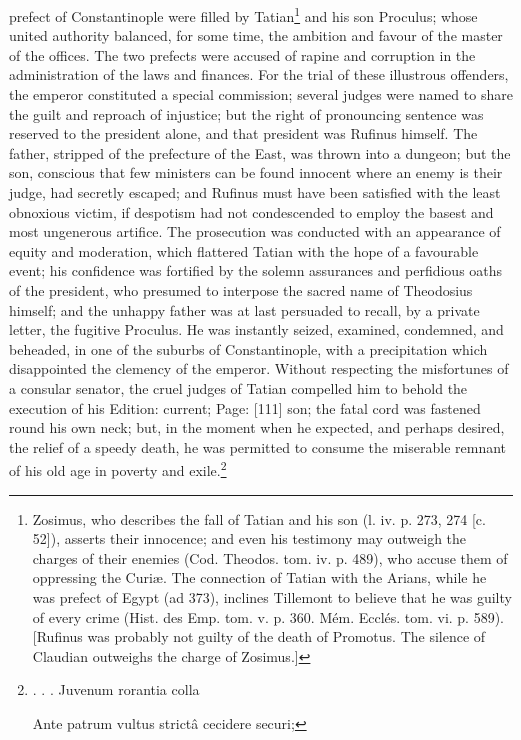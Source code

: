 prefect of Constantinople were filled by Tatian\footnote{Zosimus, who describes the fall of Tatian and his son (l. iv. p. 273, 274 [c. 52]), asserts their innocence; and even his testimony may outweigh the charges of their enemies (Cod. Theodos. tom. iv. p. 489), who accuse them of oppressing the Curiæ. The connection of Tatian with the Arians, while he was prefect of Egypt (ad 373), inclines Tillemont to believe that he was guilty of every crime (Hist. des Emp. tom. v. p. 360. Mém. Ecclés. tom. vi. p. 589). [Rufinus was probably not guilty of the death of Promotus. The silence of Claudian outweighs the charge of Zosimus.]} and his son Proculus; whose united authority balanced, for some time, the ambition and favour of the master of the offices. The two prefects were accused of rapine and corruption in the administration of the laws and finances. For the trial of these illustrous offenders, the emperor constituted a special commission; several judges were named to share the guilt and reproach of injustice; but the right of pronouncing sentence was reserved to the president alone, and that president was Rufinus himself. The father, stripped of the prefecture of the East, was thrown into a dungeon; but the son, conscious that few ministers can be found innocent where an enemy is their judge, had secretly escaped; and Rufinus must have been satisfied with the least obnoxious victim, if despotism had not condescended to employ the basest and most ungenerous artifice. The prosecution was conducted with an appearance of equity and moderation, which flattered Tatian with the hope of a favourable event; his confidence was fortified by the solemn assurances and perfidious oaths of the president, who presumed to interpose the sacred name of Theodosius himself; and the unhappy father was at last persuaded to recall, by a private letter, the fugitive Proculus. He was instantly seized, examined, condemned, and beheaded, in one of the suburbs of Constantinople, with a precipitation which disappointed the clemency of the emperor. Without respecting the misfortunes of a consular senator, the cruel judges of Tatian compelled him to behold the execution of his Edition: current; Page: [111] son; the fatal cord was fastened round his own neck; but, in the moment when he expected, and perhaps desired, the relief of a speedy death, he was permitted to consume the miserable remnant of his old age in poverty and exile.\footnote{. . . Juvenum rorantia colla

Ante patrum vultus strictâ cecidere securi;

}
